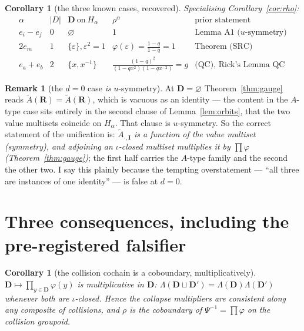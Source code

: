 \documentclass[11pt]{article}
\newtheorem{cor}[thm]{Corollary}
\theoremstyle{definition}
\newtheorem{rem}[thm]{Remark}
\newcommand{\At}{\widetilde{A}}
\newcommand{\bI}{\mathbf{I}}
\newcommand{\bD}{\mathbf{D}}
\newcommand{\bR}{\mathbf{R}}
\begin{document}
\begin{cor}[the three known cases, recovered]\label{cor:three}
Specialising Corollary~\ref{cor:rho}:
\[
\begin{array}{lllll}
\alpha & |D| & \bD\ \text{on}\ H_\alpha & \rho^{\alpha} & \text{prior statement}\\\hline
e_i-e_j & 0 & \varnothing & 1 & \text{Lemma A1 (}u\text{-symmetry)}\\
2e_m & 1 & \{\varepsilon\},\varepsilon^2=1 & \varphi(\varepsilon)=\tfrac{1-q}{1-q}=1 & \text{Theorem (SRC)}\\
e_a+e_b & 2 & \{x,x^{-1}\} & \tfrac{(1-q)^2}{(1-qx^{2})(1-qx^{-2})}=g & \text{(QC), Rick's Lemma QC}
\end{array}
\]
\end{cor}

\begin{rem}[the $d=0$ case \emph{is} $u$-symmetry]
At $\bD=\varnothing$ Theorem~\ref{thm:gauge} reads $\At(\bR)=\At(\bR)$, which is
vacuous as an identity --- the content in the $A$-type case sits entirely in the
second clause of Lemma~\ref{lem:orbits}, that the two value multisets coincide on
$H_\alpha$.  That clause is $u$-symmetry.  So the correct statement of the
unification is: \emph{$\At_{\cdot,\bI}$ is a function of the value multiset
(symmetry), and adjoining an $\iota$-closed multiset multiplies it by
$\prod\varphi$ (Theorem~\ref{thm:gauge})}; the first half carries the $A$-type
family and the second the other two.  I say this plainly because the tempting
overstatement --- ``all three are instances of one identity'' --- is false at
$d=0$.
\end{rem}

\section{Three consequences, including the pre-registered falsifier}
\label{sec:conseq}

\begin{cor}[the collision cochain is a coboundary, multiplicatively]
\label{cor:cocycle}
$\bD\mapsto\prod_{y\in\bD}\varphi(y)$ is multiplicative in $\bD$:
$\Lambda(\bD\sqcup\bD')=\Lambda(\bD)\Lambda(\bD')$ whenever both are
$\iota$-closed.  Hence the collapse multipliers are consistent along any
composite of collisions, and $\rho$ is the coboundary of
$\Psi^{-1}=\prod\varphi$ on the collision groupoid.
\end{cor}
\end{document}
